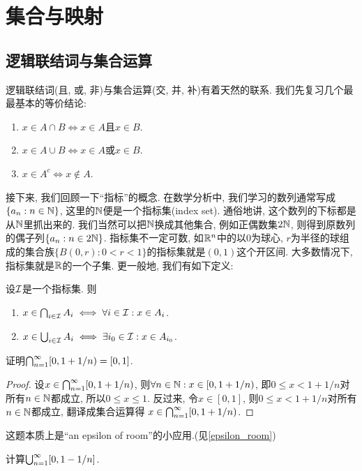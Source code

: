 \section{集合与映射}
\subsection{逻辑联结词与集合运算}
逻辑联结词(且, 或, 非)与集合运算(交, 并, 补)有着天然的联系. 我们先复习几个最最基本的等价结论:
\begin{enumerate}
    \item $x \in A \cap B \Longleftrightarrow x\in A$且$x \in B$. 
    \item $x \in A \cup B \Longleftrightarrow x\in A$或$x \in B$.
    \item $x \in A^c \Longleftrightarrow x \notin A$. 
\end{enumerate}

接下来, 我们回顾一下“指标”的概念. 在数学分析中, 我们学习的数列通常写成$\{a_n: n \in \mathbb{N}\}$, 这里的$\mathbb{N}$便是一个指标集(index set). 通俗地讲, 这个数列的下标都是从$\mathbb{N}$里抓出来的. 我们当然可以把$\mathbb{N}$换成其他集合, 例如正偶数集$2\mathbb{N}$, 则得到原数列的偶子列$\{a_n: n \in 2\mathbb{N}\}$. 指标集不一定可数, 
如$\mathbb{R}^n$中的以$0$为球心, $r$为半径的球组成的集合族$\{B(0,r): 0<r<1\}$的指标集就是$(0,1)$这个开区间. 大多数情况下, 指标集就是$\mathbb{R}$的一个子集. 更一般地, 我们有如下定义:

设$\mathcal{I}$是一个指标集. 则
\begin{enumerate}
    \item $x\in \bigcap_{i\in \mathcal{I}}A_i \iff \forall i \in \mathcal{I}: x \in A_i $.
    \item $x\in \bigcup_{i\in \mathcal{I}}A_i \iff \exists i_0 \in \mathcal{I}: x \in A_{i_0} $.
\end{enumerate}
\begin{example}
    证明$\bigcap_{n=1}^{\infty}[0, 1+1/n)=[0,1]$.
\end{example}
\begin{proof}
    设$x \in \bigcap_{n=1}^{\infty}[0, 1+1/n)$, 则$\forall n \in \mathbb{N}: x \in [0, 1+1/n)$,
    即$0\leq x < 1+1/n$对所有$n \in \mathbb{N}$都成立, 所以$0\leq x \leq 1$. 
    反过来, 令$x \in [0,1]$, 则$0 \leq x < 1+1/n$对所有$n \in \mathbb{N}$都成立, 翻译成集合运算得
    $x \in \bigcap_{n=1}^{\infty}[0, 1+1/n)$.
\end{proof}
\begin{remark}
    这题本质上是“an epsilon of room”的小应用.(见\ref{epsilon_room})
\end{remark}
\begin{exercise}
    计算$\bigcup_{n=1}^{\infty}[0, 1-1/n]$.
\end{exercise}



